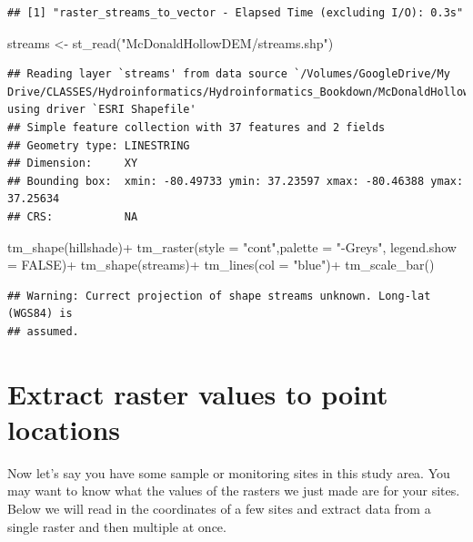 \documentclass[
]{book}
\newenvironment{Shaded}{\begin{snugshade}}{\end{snugshade}}
\newcommand{\AttributeTok}[1]{\textcolor[rgb]{0.77,0.63,0.00}{#1}}
\newcommand{\ConstantTok}[1]{\textcolor[rgb]{0.00,0.00,0.00}{#1}}
\newcommand{\FunctionTok}[1]{\textcolor[rgb]{0.00,0.00,0.00}{#1}}
\newcommand{\NormalTok}[1]{#1}
\newcommand{\OtherTok}[1]{\textcolor[rgb]{0.56,0.35,0.01}{#1}}
\newcommand{\SpecialCharTok}[1]{\textcolor[rgb]{0.00,0.00,0.00}{#1}}
\newcommand{\StringTok}[1]{\textcolor[rgb]{0.31,0.60,0.02}{#1}}
\begin{document}
\begin{verbatim}
## [1] "raster_streams_to_vector - Elapsed Time (excluding I/O): 0.3s"
\end{verbatim}

\begin{Shaded}
\begin{Highlighting}[]
\NormalTok{streams }\OtherTok{\textless{}{-}} \FunctionTok{st\_read}\NormalTok{(}\StringTok{"McDonaldHollowDEM/streams.shp"}\NormalTok{)}
\end{Highlighting}
\end{Shaded}

\begin{verbatim}
## Reading layer `streams' from data source `/Volumes/GoogleDrive/My Drive/CLASSES/Hydroinformatics/Hydroinformatics_Bookdown/McDonaldHollowDEM/streams.shp' using driver `ESRI Shapefile'
## Simple feature collection with 37 features and 2 fields
## Geometry type: LINESTRING
## Dimension:     XY
## Bounding box:  xmin: -80.49733 ymin: 37.23597 xmax: -80.46388 ymax: 37.25634
## CRS:           NA
\end{verbatim}

\begin{Shaded}
\begin{Highlighting}[]
\FunctionTok{tm\_shape}\NormalTok{(hillshade)}\SpecialCharTok{+}
  \FunctionTok{tm\_raster}\NormalTok{(}\AttributeTok{style =} \StringTok{"cont"}\NormalTok{,}\AttributeTok{palette =} \StringTok{"{-}Greys"}\NormalTok{, }\AttributeTok{legend.show =} \ConstantTok{FALSE}\NormalTok{)}\SpecialCharTok{+}
\FunctionTok{tm\_shape}\NormalTok{(streams)}\SpecialCharTok{+}
  \FunctionTok{tm\_lines}\NormalTok{(}\AttributeTok{col =} \StringTok{"blue"}\NormalTok{)}\SpecialCharTok{+}
  \FunctionTok{tm\_scale\_bar}\NormalTok{()}
\end{Highlighting}
\end{Shaded}

\begin{verbatim}
## Warning: Currect projection of shape streams unknown. Long-lat (WGS84) is
## assumed.
\end{verbatim}

\hypertarget{extract-raster-values-to-point-locations}{%
\section{Extract raster values to point locations}\label{extract-raster-values-to-point-locations}}

Now let's say you have some sample or monitoring sites in this study area. You may want to know what the values of the rasters we just made are for your sites. Below we will read in the coordinates of a few sites and extract data from a single raster and then multiple at once.
\end{document}
